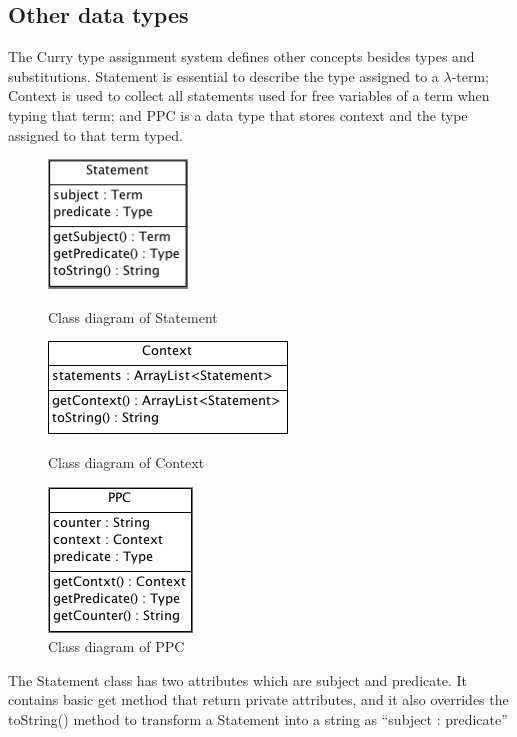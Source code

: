 \subsection{Other data types}

The Curry type assignment system defines other concepts besides types and substitutions. Statement is essential to describe the type assigned to a $\lambda$-term; Context is used to collect all statements used for free variables of a term when typing that term; and PPC is a data type that stores context and the type assigned to that term typed. 

\begin{figure}[ht]
\centering
\begin{minipage}{.3\textwidth}
\centering
\includegraphics[scale=0.6]{pics/Statement}
\caption{Class diagram of Statement}
\label{fig:statement}
\end{minipage}\hfill
\begin{minipage}{.3\textwidth}
\centering
\includegraphics[scale=0.6]{pics/Context}
\caption{Class diagram of Context}
\label{fig:context}
\end{minipage}\hfill
\begin{minipage}{.3\textwidth}
\centering
\includegraphics[scale=0.5]{pics/PPC}
\caption{Class diagram of PPC}
\label{fig:ppc}
\end{minipage}
\end{figure}

The \textsf{Statement} class has two attributes which are subject and predicate. It contains basic get method that return \textsf{private} attributes, and it also overrides the \textsf{toString()} method to transform a \textsf{Statement} into a string as ``subject : predicate''

